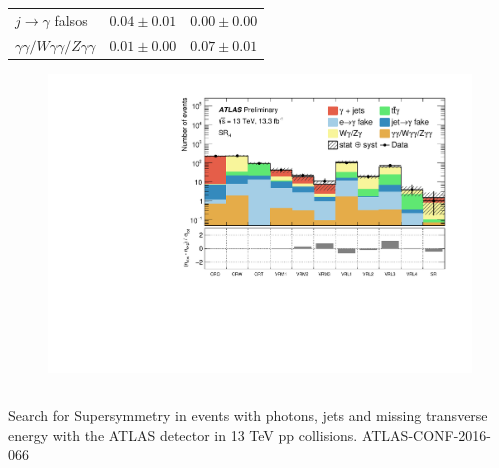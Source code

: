 \documentclass[10pt, compress,spanish]{beamer}
\begin{document}
\begin{frame}[fragile]
\begin{columns}
\begin{column}{0.45\textwidth}
\begin{table}
{\begin{tabular}{ l r r }
  $j\rightarrow\gamma$ falsos & $0.04 \pm 0.01$ & $0.00 \pm 0.00$\\

  $\gamma\gamma / W\gamma\gamma / Z\gamma\gamma$ & $0.01 \pm 0.00$ & $0.07 \pm 0.01$\\

  \hline


\end{tabular}}
\end{table}


\begin{figure}
    \includegraphics[scale=0.25]{SRH.pdf}
\end{figure}

\end{column}
\end{columns}

\renewcommand{\arraystretch}{1.3}
\tiny Search for Supersymmetry in events with photons, jets and missing transverse energy with the ATLAS detector in 13 TeV pp collisions. ATLAS-CONF-2016-066
\renewcommand{\arraystretch}{1}


\end{frame}



\end{document}
